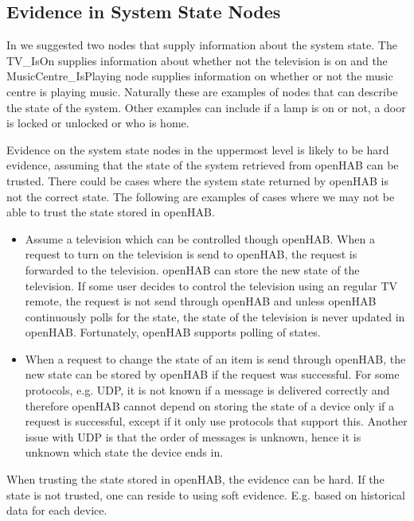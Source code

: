 \subsection{Evidence in System State Nodes}
\label{sec:design:bayesian-network:system-state-nodes-evidence}

In  we suggested two nodes that supply information about the system state. The TV\_IsOn supplies information about whether not the television is on and the MusicCentre\_IsPlaying node supplies information on whether or not the music centre is playing music. Naturally these are examples of nodes that can describe the state of the system. Other examples can include if a lamp is on or not, a door is locked or unlocked or who is home.

Evidence on the system state nodes in the uppermost level is likely to be hard evidence, assuming that the state of the system retrieved from openHAB can be trusted. There could be cases where the system state returned by openHAB is not the correct state. The following are examples of cases where we may not be able to trust the state stored in openHAB.

\begin{itemize}
\item Assume a television which can be controlled though openHAB. When a request to turn on the television is send to openHAB, the request is forwarded to the television. openHAB can store the new state of the television. If some user decides to control the television using an regular TV remote, the request is not send through openHAB and unless openHAB continuously polls for the state, the state of the television is never updated in openHAB. Fortunately, openHAB supports polling of states.
\item When a request to change the state of an item is send through openHAB, the new state can be stored by openHAB if the request was successful. For some protocols, e.g. UDP, it is not known if a message is delivered correctly and therefore openHAB cannot depend on storing the state of a device only if a request is successful, except if it only use protocols that support this. Another issue with UDP is that the order of messages is unknown, hence it is unknown which state the device ends in.
\end{itemize}

When trusting the state stored in openHAB, the evidence can be hard. If the state is not trusted, one can reside to using soft evidence. E.g. based on historical data for each device.

